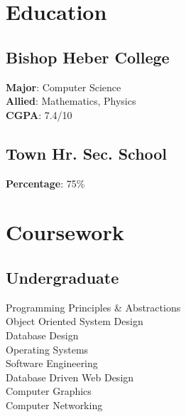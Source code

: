 \documentclass[]{deedy-resume-openfont}
\begin{document}
%
%


%
%

\begin{minipage}[t]{0.33\textwidth} 


\section{Education} 

\subsection{Bishop Heber College}
\textbf{Major}: Computer Science \\
\textbf{Allied}: Mathematics, Physics \\
\textbf{CGPA}: 7.4/10
\sectionsep

\subsection{Town Hr. Sec. School}
\textbf{Percentage}: 75\%
\sectionsep


\section{Coursework}

\subsection{Undergraduate}
Programming Principles \& Abstractions\\
Object Oriented System Design \\
Database Design\\
Operating Systems\\
Software Engineering\\
Database Driven Web Design\\
Computer Graphics\\
Computer Networking\\
\sectionsep


\end{minipage}
\end{document}

